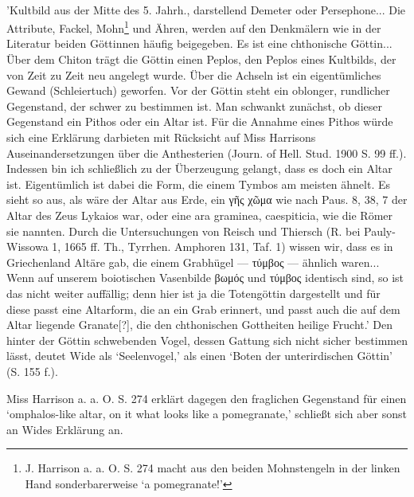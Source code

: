 \documentclass[a4paper, 11pt, oneside]{article}
\begin{document}
\paragraph{}
'Kultbild aus der Mitte des 5. Jahrh., darstellend Demeter oder Persephone... Die Attribute, Fackel, Mohn\footnote{J. Harrison a. a. O. S. 274 macht aus den beiden Mohnstengeln in der linken Hand sonderbarerweise `a pomegranate!'} und Ähren, werden auf den Denkmälern wie in der Literatur beiden Göttinnen häufig beigegeben. Es ist eine chthonische Göttin... Über dem Chiton trägt die Göttin einen Peplos, den Peplos eines Kultbilds, der von Zeit zu Zeit neu angelegt wurde. Über die Achseln ist ein eigentümliches Gewand (Schleiertuch) geworfen. Vor der Göttin steht ein oblonger, rundlicher Gegenstand, der schwer zu bestimmen ist. Man schwankt zunächst, ob dieser Gegenstand ein Pithos oder ein Altar ist. Für die Annahme eines Pithos würde sich eine Erklärung darbieten mit Rücksicht auf Miss Harrisons Auseinandersetzungen über die Anthesterien (Journ. of Hell. Stud. 1900 S. 99 ff.). Indessen bin ich schließlich zu der Überzeugung gelangt, dass es doch ein Altar ist. Eigentümlich ist dabei die Form, die einem Tymbos am meisten ähnelt. Es sieht so aus, als wäre der Altar aus Erde, ein γῆς χῶμα wie nach Paus. 8, 38, 7 der Altar des Zeus Lykaios war, oder eine ara graminea, caespiticia, wie die Römer sie nannten. Durch die Untersuchungen von Reisch und Thiersch (R. bei Pauly-Wissowa 1, 1665 ff. Th., Tyrrhen. Amphoren 131, Taf. 1) wissen wir, dass es in Griechenland Altäre gab, die einem Grabhügel --- τύμβος --- ähnlich waren... Wenn auf unserem boiotischen Vasenbilde βωμός und τύμβος identisch sind, so ist das nicht weiter auffällig; denn hier ist ja die Totengöttin dargestellt und für diese passt eine Altarform, die an ein Grab erinnert, und passt auch die auf dem Altar liegende Granate[?], die den chthonischen Gottheiten heilige Frucht.' Den hinter der Göttin schwebenden Vogel, dessen Gattung sich nicht sicher bestimmen lässt, deutet Wide als `Seelenvogel,' als einen `Boten der unterirdischen Göttin' (S. 155 f.).

Miss Harrison a. a. O. S. 274 erklärt dagegen den fraglichen Gegenstand für einen `omphalos-like altar, on it what looks like a pomegranate,' schließt sich aber sonst an Wides Erklärung an.
\end{document}
